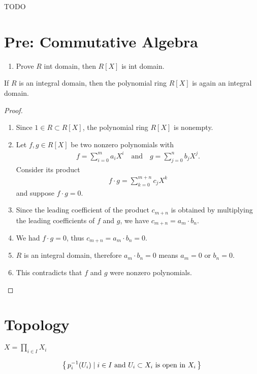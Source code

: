 TODO

\part{Pre: Commutative Algebra}

\begin{enumerate}
    \item Prove \(R\) int domain, then \(R[X]\) is int domain.
\end{enumerate}

\begin{proposition}
    If \(R\) is an integral domain, then the polynomial ring \(R[X]\) is again an integral domain.
\end{proposition}
\begin{proof}
    \begin{enumerate}
        \item Since \(1 \in R \subset R[X]\), the polynomial ring \(R[X]\) is nonempty.
        \item Let \(f, g \in R[X]\) be two nonzero polynomials with
        \begin{align*}
            f = \sum_{i = 0}^{m} a_i X^i \quad \text{and} \quad g = \sum_{j = 0}^{n} b_j X^j \text{.}
        \end{align*}
        Consider its product
        \begin{align*}
            f \cdot g = \sum_{k = 0}^{m + n} c_j X^k
        \end{align*}
        and suppose \(f \cdot g = 0\).
        \item Since the leading coefficient of the product \(c_{m+n}\) is obtained by multiplying the leading coefficients of \(f\) and \(g\), we have \(c_{m+n} = a_m \cdot b_n\).
        \item We had \(f \cdot g = 0\), thus \(c_{m+n} = a_m \cdot b_n = 0\).
        \item \(R\) is an integral domain, therefore \(a_m \cdot b_n = 0\) means \(a_m = 0\) or \(b_n = 0\).
        \item This contradicts that \(f\) and \(g\) were nonzero polynomials.
    \end{enumerate}
\end{proof}

\part{Topology}

\begin{defbox}
    \begin{definition}
        \label{def:product_topology}
        \(X = \prod_{i \in I} X_i\)

        \begin{align*}
            \left\{\, p_{i}^{-1}(U_i) \mathrel{\mid} i \in I \text{ and } U_i \subset X_i \text{ is open in }X_i \,\right\}
        \end{align*}
    \end{definition}
\end{defbox}